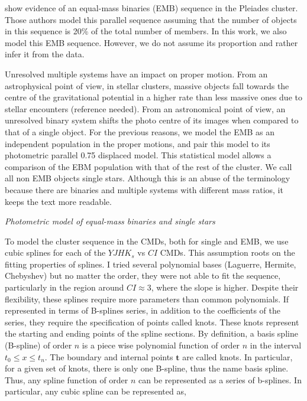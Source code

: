 \citet{Sarro2014} show evidence of an equal-mass binaries (EMB) sequence in the Pleiades cluster. Those authors model this parallel sequence assuming that the number of objects in this sequence is 20\% of the total number of members. In this work, we also model this EMB sequence. However, we do not assume its proportion and rather infer it from the data. 

Unresolved multiple systems have an impact on proper motion. From an astrophysical point of view, in stellar clusters, massive objects fall towards the centre of the gravitational potential in a higher rate than less massive ones due to stellar encounters (reference needed). From an astronomical point of view, an unresolved binary system shifts the photo centre of its images when compared to that of a single object. For the previous reasons, we model the EMB as an independent population in the proper motions, and pair this model to its photometric parallel 0.75 displaced model. This statistical model allows a comparison of the EBM population with that of the rest of the cluster. We call all non EMB objects single stars. Although this is an abuse of the terminology because there are binaries and multiple systems with different mass ratios, it keeps the text more readable.

\emph{Photometric model of equal-mass binaries and single stars}

To model the cluster sequence in the CMDs, both for single and EMB, we use cubic splines for each of the $YJHK_s$ vs $CI$ CMDs. This assumption roots on the fitting properties of splines. I tried several polynomial bases (Laguerre, Hermite, Chebyshev) but no matter the order, they were not able to fit the sequence, particularly in the region around $CI \approx 3$, where the slope is higher. Despite their flexibility, these splines require more parameters than common polynomials. If represented in terms of B-splines series, in addition to the coefficients of the series, they require the specification of points called knots. These knots represent the starting and ending points of the spline sections. By definition, a basis spline (B-spline) of order $n$ is a piece wise polynomial function of order $n$ in the interval $t_0 \leq x \leq t_n$. The boundary and internal points $\mathbf{t}$ are called knots. In particular, for a given set of knots, there is only one B-spline, thus the name basis spline. Thus, any spline function of order $n$ can be represented as a series of b-splines. In particular, any cubic spline can be represented as,

